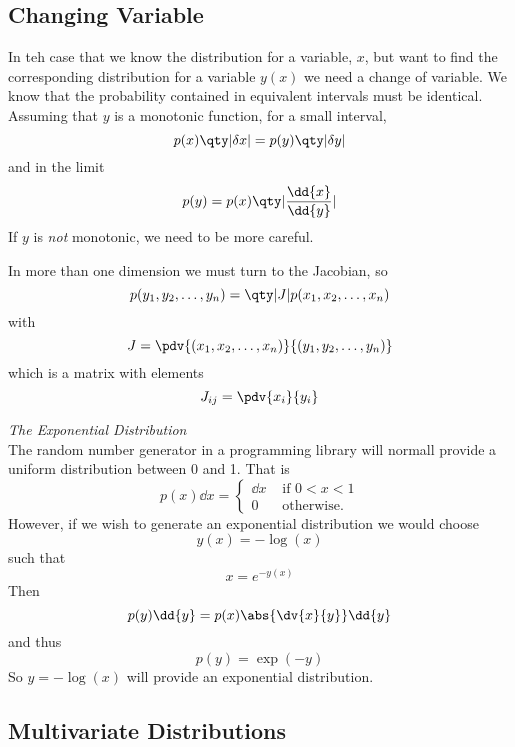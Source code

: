 \documentclass{dwnotes}         		        %
\begin{document}
\subsection{Changing Variable}
\label{sec:changevariable}

In teh case that we know the distribution for a variable, $x$, but
want to find the corresponding distribution for a variable $y(x)$ we
need a change of variable. We know that the probability contained in
equivalent intervals must be identical. Assuming that $y$ is a monotonic function, for a small interval, 
\[ p(x) \qty| \delta x | = p(y) \qty| \delta y | \]
and in the limit
\begin{equation}
  \label{eq:changevaronedim}
  p(y) = p(x) \qty| \frac{\dd{x}}{\dd{y}} |
\end{equation}
If $y$ is \emph{not} monotonic, we need to be more careful.

In more than one dimension we must turn to the Jacobian, so
\[ p(y_1, y_2, \dots, y_n) = \qty|J| p(x_1, x_2, \dots, x_n) \]
with
\begin{equation}
  \label{eq:jacobian}
  J = \pdv{(x_1, x_2, \dots, x_n)}{(y_1, y_2, \dots, y_n)}
\end{equation}
which is a matrix with elements
\[ J_{ij} = \pdv{x_i}{y_i} \]

\begin{example}{\em The Exponential Distribution}\\
  The random number generator in a programming library will normall
  provide a uniform distribution between 0 and 1. That is
\[ p(x) \dd{x} = 
\begin{cases}
  \dd{x} & \text{ if } 0 < x < 1 \\
0 & \text{ otherwise. }
\end{cases}\] However, if we wish to generate an exponential
distribution we would choose
\[ y(x) = - \log(x) \] such that \[ x = e^{-y(x)} \]
Then
\[ p(y) \dd{y} = p(x) \abs{\dv{x}{y}} \dd{y} \]
and thus
\[ p(y) = \exp(-y) \] So $y = - \log(x)$ will provide an exponential
distribution.
\end{example}

\subsection{Multivariate Distributions}
\label{sec:mult-distr}
\end{document}
